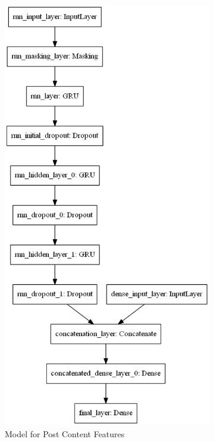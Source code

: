 \documentclass[acmsmall]{acmart}
\begin{document}
\begin{figure}[H]
\centering
\begin{subfigure}{.5\textwidth}
\centering
  \includegraphics[width=.9\linewidth]{assets/AuthorAttributionModel_post_content_features.png} 
  \caption{Model for Post Content Features}
  \label{fig:post_content_model}
 \end{subfigure}%
\begin{subfigure}{.5\textwidth}

\end{subfigure}
\end{figure}
\end{document}
